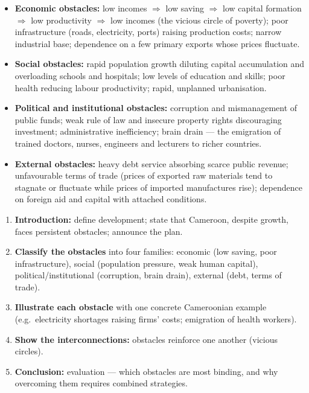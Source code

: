 \documentclass[11pt]{article}
\newcommand{\cle}[1]{{\popxbold\color{popdark}#1}}
\begin{document}
\begin{itemize}
\item \textbf{Economic obstacles:} low incomes $\Rightarrow$ low saving $\Rightarrow$ low capital formation $\Rightarrow$ low productivity $\Rightarrow$ low incomes (the \cle{vicious circle of poverty}); poor infrastructure (roads, electricity, ports) raising production costs; narrow industrial base; dependence on a few primary exports whose prices fluctuate.
\item \textbf{Social obstacles:} rapid population growth diluting capital accumulation and overloading schools and hospitals; low levels of education and skills; poor health reducing labour productivity; rapid, unplanned urbanisation.
\item \textbf{Political and institutional obstacles:} corruption and mismanagement of public funds; weak rule of law and insecure property rights discouraging investment; administrative inefficiency; \cle{brain drain} — the emigration of trained doctors, nurses, engineers and lecturers to richer countries.
\item \textbf{External obstacles:} heavy debt service absorbing scarce public revenue; unfavourable \cle{terms of trade} (prices of exported raw materials tend to stagnate or fluctuate while prices of imported manufactures rise); dependence on foreign aid and capital with attached conditions.
\end{itemize}

\begin{methode}
\begin{enumerate}
\item \textbf{Introduction:} define development; state that Cameroon, despite growth, faces persistent obstacles; announce the plan.
\item \textbf{Classify the obstacles} into four families: economic (low saving, poor infrastructure), social (population pressure, weak human capital), political/institutional (corruption, brain drain), external (debt, terms of trade).
\item \textbf{Illustrate each obstacle} with one concrete Cameroonian example (e.g.\ electricity shortages raising firms' costs; emigration of health workers).
\item \textbf{Show the interconnections:} obstacles reinforce one another (vicious circles).
\item \textbf{Conclusion:} evaluation — which obstacles are most binding, and why overcoming them requires combined strategies.
\end{enumerate}
\end{methode}
\end{document}
